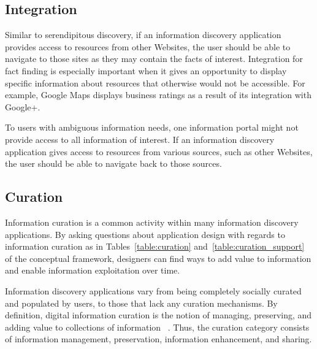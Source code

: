 {{} %
{\subsection{Integration}

Similar to serendipitous discovery, if an information discovery application provides access to resources from other Websites, the user should be able to navigate to those sites as they may contain the facts of interest. Integration for fact finding is especially important when it gives an opportunity to display specific information about resources that otherwise would not be accessible. For example, Google Maps displays business ratings as a result of its integration with Google+.

To users with ambiguous information needs, one information portal might not provide access to all information of interest. If an information discovery application gives access to resources from various sources, such as other Websites, the user should be able to navigate back to those sources.  
} %

{\subsection{Curation}

Information curation is a common activity within many information discovery applications. By asking questions about application design with regards to information curation as in Tables~\ref{table:curation} and~\ref{table:curation_support} of the conceptual framework, designers can find ways to add value to information and enable information exploitation over time.

Information discovery applications vary from being completely socially curated and populated by users, to those that lack any curation mechanisms. 
By definition, digital information curation is the notion of managing, preserving, and adding value to collections of information ~\cite{beagrie, wittaker}. Thus, the curation category consists of information management, preservation, information enhancement, and sharing.


}}
